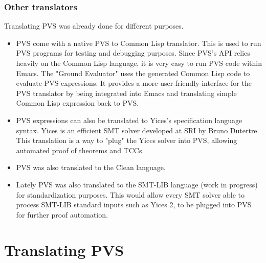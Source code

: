 \documentclass[12pt,a4paper]{article}
\begin{document}
\subsubsection*{Other translators}

Translating PVS was already done for different purposes.
\begin{itemize}
\item PVS come with a native PVS to Common Lisp translator. This is used to run PVS programs for testing and debugging purposes. Since PVS's API relies heavily on the Common Lisp language, it is very easy to run PVS code within Emacs. The "Ground Evaluator" uses the generated Common Lisp code to evaluate PVS expressions. It provides a more user-friendly interface for the PVS translator by being integrated into Emacs and translating simple Common Lisp expression back to PVS.
\item PVS expressions can also be translated to Yices's specification language syntax. Yices is an efficient SMT solver developed at SRI by Bruno Dutertre. This translation is a way to "plug" the Yices solver into PVS, allowing automated proof of theorems and TCCs.
\item PVS was also translated to the Clean language.
\item Lately PVS was also translated to the SMT-LIB language (work in progress) for standardization purposes. This would allow every SMT solver able to process SMT-LIB standard inputs such as Yices 2, to be plugged into PVS for further proof automation.
\end{itemize}



\section{Translating PVS}
\end{document}
